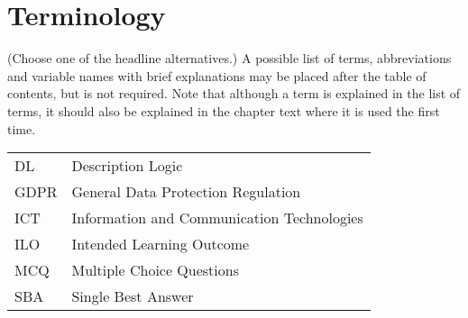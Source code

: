 \section*{Terminology}\label{sec:terminology}
{}
(Choose one of the headline alternatives.) 
A possible list of terms, abbreviations and variable names with brief
explanations may be placed after the table of contents, but is not required.
Note that although a term is explained in the list of terms, it should also be
explained in the chapter text where it is used the first time.

\begin{table}[ht!]
  \begin{tabular}{l l}
DL & Description Logic\\
GDPR & General Data Protection Regulation\\
ICT & Information and Communication Technologies\\
ILO & Intended Learning Outcome\\
MCQ & Multiple Choice Questions\\
SBA & Single Best Answer\\
\end{tabular}
\end{table}
